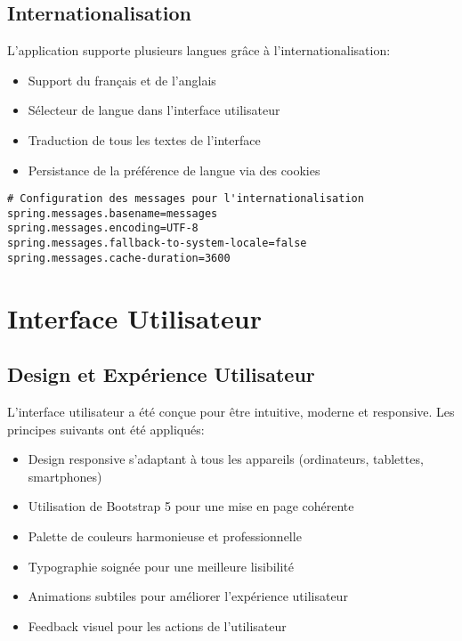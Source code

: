 \documentclass[12pt,a4paper]{report}
\begin{document}
\section{Internationalisation}
L'application supporte plusieurs langues grâce à l'internationalisation:

\begin{itemize}
    \item Support du français et de l'anglais
    \item Sélecteur de langue dans l'interface utilisateur
    \item Traduction de tous les textes de l'interface
    \item Persistance de la préférence de langue via des cookies
\end{itemize}

\begin{lstlisting}[caption=Configuration de l'internationalisation]
# Configuration des messages pour l'internationalisation
spring.messages.basename=messages
spring.messages.encoding=UTF-8
spring.messages.fallback-to-system-locale=false
spring.messages.cache-duration=3600
\end{lstlisting}

\chapter{Interface Utilisateur}

\section{Design et Expérience Utilisateur}
L'interface utilisateur a été conçue pour être intuitive, moderne et responsive. Les principes suivants ont été appliqués:

\begin{itemize}
    \item Design responsive s'adaptant à tous les appareils (ordinateurs, tablettes, smartphones)
    \item Utilisation de Bootstrap 5 pour une mise en page cohérente
    \item Palette de couleurs harmonieuse et professionnelle
    \item Typographie soignée pour une meilleure lisibilité
    \item Animations subtiles pour améliorer l'expérience utilisateur
    \item Feedback visuel pour les actions de l'utilisateur
\end{itemize}
\end{document}
